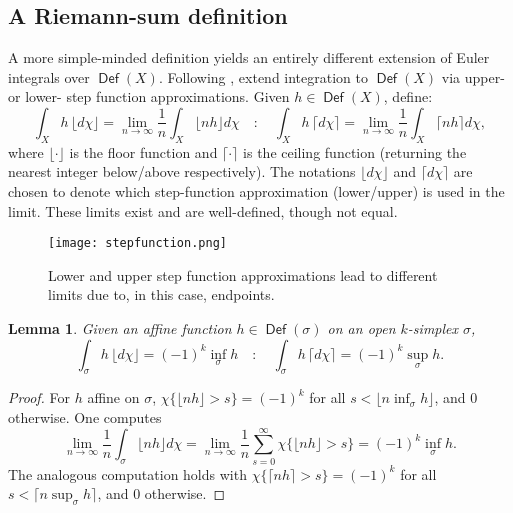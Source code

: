 \documentclass{psapm-l}
\newtheorem{lemma}[theorem]{Lemma}
\theoremstyle{definition}
\theoremstyle{remark}
\numberwithin{equation}{section}
\begin{document}
\subsection{A Riemann-sum definition}
\label{sec:riemann}

A more simple-minded definition yields an entirely different extension of Euler integrals over ${{{\operatorname{\mathsf{{Def}}}}}}(X)$. Following \cite{BG:PNAS}, extend integration to ${{{\operatorname{\mathsf{{Def}}}}}}(X)$ via upper- or lower- step function approximations. Given $h\in {{{\operatorname{\mathsf{{Def}}}}}}(X)$, define:
\begin{equation}
\label{eq:realintegral}
    \int_X h\,{{\lfloor d\chi\rfloor}}
    =
    \lim_{n\to\infty}
    \frac{1}{n}\int_X \lfloor nh\rfloor d\chi
    \quad : \quad
    \int_X h\,{{\lceil d\chi\rceil}}
    =
    \lim_{n\to\infty}
    \frac{1}{n}\int_X \lceil nh\rceil d\chi ,
\end{equation}
where $\lfloor\cdot\rfloor$ is the floor function and $\lceil\cdot\rceil$ is the ceiling function (returning the nearest integer below/above respectively). The notations ${{\lfloor d\chi\rfloor}}$ and ${{\lceil d\chi\rceil}}$ are chosen to denote which step-function approximation (lower/upper) is used in the limit. These limits exist and are well-defined, though not equal.

\begin{figure}[hbt]
\begin{center}
\texttt{[image: stepfunction.png]}
\caption{Lower and upper step function approximations lead to different limits due to, in this case, endpoints.}
\label{fig:stepfunction}
\end{center}
\end{figure}

\begin{lemma}
\label{lem:r-simplex}
Given an affine function $h\in{{{\operatorname{\mathsf{{Def}}}}}}(\sigma)$ on an open $k$-simplex
$\sigma$,
\begin{equation}
    \int_\sigma h\,{{\lfloor d\chi\rfloor}} = (-1)^k\inf_\sigma h
    \quad : \quad
    \int_\sigma h\,{{\lceil d\chi\rceil}} = (-1)^k\sup_\sigma h    .
\end{equation}
\end{lemma}
\begin{proof}
For $h$ affine on $\sigma$, $\chi\{\lfloor nh\rfloor > s\}=(-1)^k$ for all $s<\lfloor n\inf_\sigma h\rfloor$, and $0$ otherwise. One
computes
\[
    \lim_{n\to\infty}
    \frac{1}{n}\int_{\sigma}\lfloor nh\rfloor d\chi
    =
    \lim_{n\to\infty}
    \frac{1}{n}\sum_{s=0}^\infty \chi\{\lfloor nh\rfloor > s\}
    =
    (-1)^k\inf_\sigma h
    .
\]
The analogous computation holds with $\chi\{\lceil nh\rceil > s\}=(-1)^k$ for all $s<\lceil n\sup_\sigma h\rceil$, and $0$ otherwise.
\end{proof}
\end{document}
